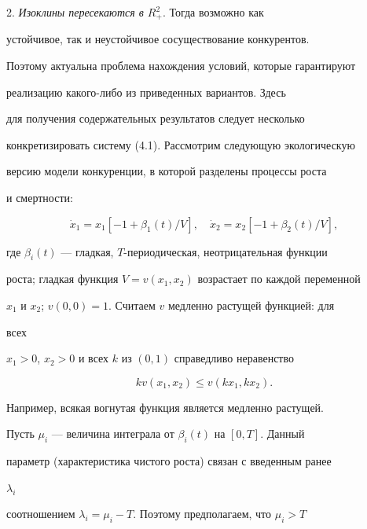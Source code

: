  


2. {\it Изоклины пересекаются в $R^2_+$}. Тогда возможно как 


устойчивое, так и неустойчивое сосуществование конкурентов. 


 


Поэтому актуальна проблема нахождения условий, которые гарантируют 


реализацию ка\-ко\-го-либо из приведенных вариантов. Здесь 


для получения содержательных результатов следует несколько 


конкретизировать систему (4.1). Рассмотрим следующую экологическую 


версию модели конкуренции, в которой разделены процессы роста 


и смертности: 


\begin{equation} 


\Dot x_1=x_1[-1+\beta_1(t)/V],\quad 


\Dot x_2=x_2[-1+\beta_2(t)/V], 


\end{equation} 


где $\beta_i(t)$ --- гладкая, $T$-периодическая, неотрицательная функции 


роста; гладкая функция $V=v(x_1,x_2)$ возрастает по каждой переменной 


$x_1$ и $x_2$; $v(0,0)=1$. Считаем $v$ медленно растущей функцией: для 


всех 


$x_1>0$, $x_2>0$ и всех $k$ из $(0,1)$ справедливо неравенство 


\begin{equation} 


k v(x_1,x_2)\le v(k x_1,k x_2). 


\end{equation} 


Например, всякая вогнутая функция является медленно растущей. 


 


Пусть $\mu_i$ --- величина интеграла от $\beta_i(t)$ на $[0,T]$. Данный 


параметр (характеристика чистого роста) связан с введенным ранее 


$\lambda_i$ 


соотношением $\lambda_i=\mu_i-T$. Поэтому предполагаем, что $\mu_i>T$ 


